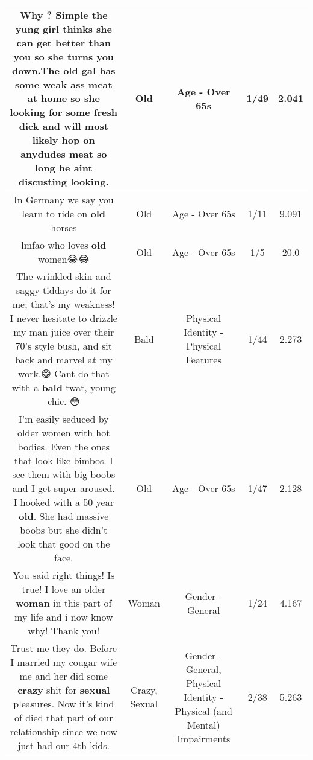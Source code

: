 \documentclass[11pt]{article}
\newlength\mylength
\begin{document}
\begin{center}
\begin{longtable}{|C{.65\mylength}|C{.30\mylength}|C{.12\mylength}|C{.12\mylength}|C{.12\mylength}|}
  \small Why ? Simple the yung girl thinks she can get better than you so she turns you down.The \textbf{old} gal has some weak ass meat at home so she looking for some fresh dick and will most likely hop on anydudes meat so long he aint discusting looking.\normalsize   & Old & Age - Over 65s & 1/49 & 2.041 \\  \hline
  \small In Germany we say you learn to ride on \textbf{old} horses\normalsize   & Old & Age - Over 65s & 1/11 & 9.091 \\  \hline
  \small lmfao who loves \textbf{old} women😂😂\normalsize   & Old & Age - Over 65s & 1/5 & 20.0 \\  \hline
  \small The wrinkled skin and saggy tiddays do it for me; that's my weakness!   I never hesitate to drizzle my man juice over their 70's style bush, and sit back and marvel at my work.😁  Cant do that with a \textbf{bald} twat, young chic. 😳\normalsize   & Bald & Physical Identity - Physical Features & 1/44 & 2.273 \\  \hline
  \small I'm easily seduced by older women with hot bodies. Even the ones that look like bimbos. I see them with big boobs and I get super aroused. I hooked with a 50 year \textbf{old}. She had massive boobs but she didn't look that good on the face.\normalsize   & Old & Age - Over 65s & 1/47 & 2.128 \\  \hline
  \small You said right things! Is true! I love an older \textbf{woman} in this part of my life and i now know why! Thank you!\normalsize   & Woman & Gender - General & 1/24 & 4.167 \\  \hline
  \small Trust me they do. Before I married my cougar wife me and her did some \textbf{crazy} shit for \textbf{sexual} pleasures. Now it's kind of died that part of our relationship since we now just had our 4th kids.\normalsize   & Crazy, Sexual & Gender - General, Physical Identity - Physical (and Mental) Impairments & 2/38 & 5.263 \\  \hline

\end{longtable}
\end{center}
\end{document}
